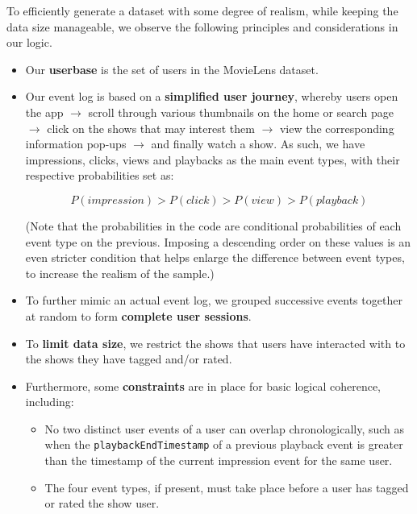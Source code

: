\documentclass[10pt,titlepage]{article}
\begin{document}
\begin{itemize}
        To efficiently generate a dataset with some degree of realism, while keeping the data size manageable, we observe the following principles and considerations in our
        logic.

        \begin{itemize}
            \item Our \textbf{userbase} is the set of users in the MovieLens dataset.

            \item Our event log is based on a \textbf{simplified user journey}, whereby users open the app $\rightarrow$
                scroll through various thumbnails on the home or search page $\rightarrow$ click on the shows that may
                interest them $\rightarrow$ view the corresponding information pop-ups $\rightarrow$ and finally watch a
                show. As such, we have impressions, clicks, views and playbacks as the main event types, with their
                respective probabilities set as:

                $$P(impression) > P(click) > P(view) > P(playback)$$

                (Note that the probabilities in the code are conditional probabilities of each event type on the
                previous. Imposing a descending order on these values is an even stricter condition that helps enlarge
                the difference between event types, to increase the realism of the sample.)
            \item To further mimic an actual event log, we grouped successive events together at random to form 
                \textbf{complete user sessions}.

            \item To \textbf{limit data size}, we restrict the shows that users have interacted with to the shows they have
                tagged and/or rated.

            \item Furthermore, some \textbf{constraints} are in place for basic logical coherence, including:

                \begin{itemize}
                    \item No two distinct user events of a user can overlap chronologically, such as when the
                        \texttt{playbackEndTimestamp} of a previous playback event is greater than the timestamp of the
                        current impression event for the same user.
                    \item The four event types, if present, must take place before a user has tagged or rated the show
                        user.
                \end{itemize}
        \end{itemize}

\end{itemize}
\end{document}
